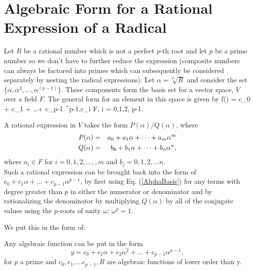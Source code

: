 \section{Algebraic Form for a Rational Expression of a Radical}

Let $R$ be a rational number which is not a perfect $p$-th root and let $p$ be a prime number so we don't have to further reduce the expression (composite numbers can always be factored into primes which can subsequently 
be considered separately by nesting the radical expressions). Let $\alpha = \sqrt[p]{R}$ and
consider the set $\{ \alpha, \alpha^{2}, \hdots, \alpha^{(p-1)} \}$. These components form the basis set for a vector space, $V$ over a field $F$. The general form for an element in this space is given by
\be  f(\alpha) = c_0 + c_1 \alpha  + \dots +  c_{p-1} \alpha^{p-1},\quad c_i \in F, i = 0,1,2\hdots, p-1. \label{AlphaBasis} \ee

A rational expression in $V$ takes the form \( P(\alpha) / Q(\alpha) \), where 
\begin{eqnarray*}
P(\alpha) &=& a_0 + a_1 \alpha  + \dots +  a_{m} \alpha^{m} \cr
Q(\alpha) &=& b_0 + b_1 \alpha  + \dots +  b_{n} \alpha^{n},
\end{eqnarray*}where $a_i \in F$ for $i = 0, 1, 2, \hdots, ,m$  and $b_j = 0, 1, 2, \hdots n$. \\

Such a rational expression can be brought back into the form of   \(  c_0 + c_1 \alpha  + \dots +  c_{p-1} \alpha^{p-1} \), by first using Eq. (\ref{AlphaBasis}) for any terms with degree greater than $p$ in either the numerator or denominator and by rationalizing the denominator by multiplying $Q(\alpha)$
by all of the conjugate values using the $p$-roots of unity $\omega$: $\omega^p = 1$.

We put this in the form of:
\begin{theorem}
Any algebraic function can be put in the form
\[ y = c_0 + c_1 \alpha + c_2 \alpha^2 + \hdots + c_{p-1} \alpha^{p-1}, \]
for $p$ a prime and $c_0, c_1, \hdots c_{p-1}, R$ are algebraic functions of lower order than y.
\end{theorem}


